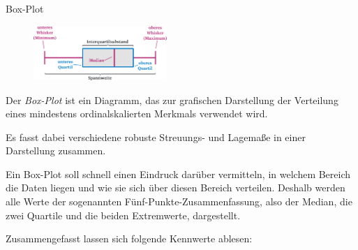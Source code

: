 \begin{defi}{Box-Plot}
    \begin{figure}
        \begin{center}
            \includegraphics[width=0.45\textwidth]{includes/figures/definition_boxplot.png}
        \end{center}
    \end{figure}
    Der \emph{Box-Plot} ist ein Diagramm, das zur grafischen Darstellung der Verteilung eines mindestens ordinalskalierten Merkmals verwendet wird.

    Es fasst dabei verschiedene robuste Streuungs- und Lagemaße in einer Darstellung zusammen.

    Ein Box-Plot soll schnell einen Eindruck darüber vermitteln, in welchem Bereich die Daten liegen und wie sie sich über diesen Bereich verteilen. Deshalb werden alle Werte der sogenannten Fünf-Punkte-Zusammenfassung, also der Median, die zwei Quartile und die beiden Extremwerte, dargestellt.

    Zusammengefasst lassen sich folgende Kennwerte ablesen:


\end{defi}
